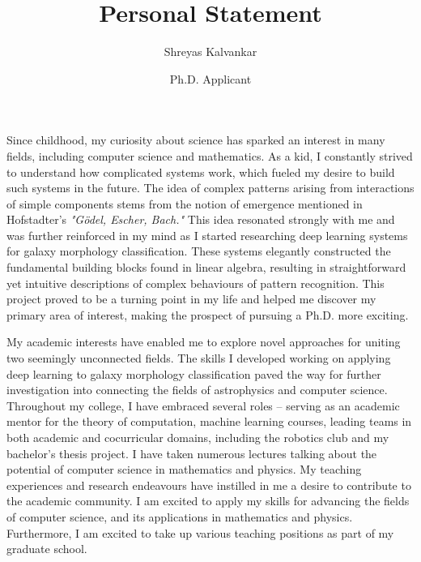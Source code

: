 \documentclass[12pt]{article}
\title{Personal Statement}
\author{Shreyas Kalvankar}
\date{Ph.D. Applicant}
\begin{document}
  \maketitle%
  \thispagestyle{empty}

\vspace{5pt}

Since childhood, my curiosity about science has sparked an
interest in many fields, including computer science and mathematics. As a kid, I
constantly strived to understand how complicated systems work, which fueled my
desire to build such systems in the future. The idea of complex patterns arising
from interactions of simple components stems from the notion of emergence
mentioned in Hofstadter’s \textit{"Gödel, Escher, Bach."} This idea resonated strongly
with me and was further reinforced in my mind as I started researching deep
learning systems for galaxy morphology classification. These systems elegantly
constructed the fundamental building blocks found in linear algebra, resulting
in straightforward yet intuitive descriptions of complex behaviours of pattern
recognition. This project proved to be a turning point in my life and helped me
discover my primary area of interest, making the prospect of pursuing a Ph.D.
more exciting.

My academic interests have enabled me to explore novel approaches for uniting
two seemingly unconnected fields. The skills I developed working on applying
deep learning to galaxy morphology classification paved the way for further
investigation into connecting the fields of astrophysics and computer science.
Throughout my college, I have embraced several roles -- serving as an academic
mentor for the theory of computation, machine learning courses, leading teams in
both academic and cocurricular domains, including the robotics club and my
bachelor’s thesis project. I have taken numerous lectures talking about the
potential of computer science in mathematics and physics. My teaching
experiences and research endeavours have instilled in me a desire to contribute
to the academic community. I am excited to apply my skills for advancing the
fields of computer science, and its applications in mathematics and physics.
Furthermore, I am excited to take up various teaching positions as part of my
graduate school.
\end{document}
